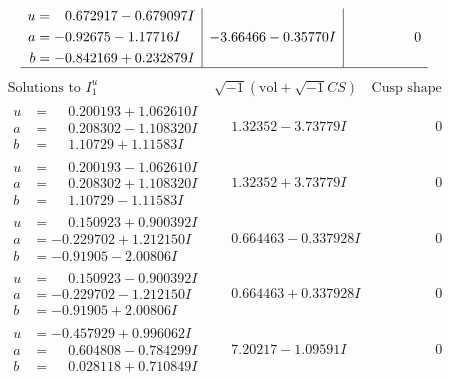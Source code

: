 \documentclass[1p]{elsarticle_modified}
\theoremstyle{definition}
\newcommand{\I}{\sqrt{-1}}
\begin{document}
$$\begin{array}{c|c|c}
\begin{aligned}
u &= \phantom{-}0.672917 - 0.679097 I \\
a &= -0.92675 - 1.17716 I \\
b &= -0.842169 + 0.232879 I\end{aligned}
 & -3.66466 - 0.35770 I & \phantom{-0.000000 } 0\\
 \hline 
 \end{array}$$\newpage$$\begin{array}{c|c|c}  
\text{Solutions to }I^u_{1}& \I (\text{vol} + \sqrt{-1}CS) & \text{Cusp shape}\\
 \hline 
\begin{aligned}
u &= \phantom{-}0.200193 + 1.062610 I \\
a &= \phantom{-}0.208302 - 1.108320 I \\
b &= \phantom{-}1.10729 + 1.11583 I\end{aligned}
 & \phantom{-}1.32352 - 3.73779 I & \phantom{-0.000000 } 0 \\ \hline\begin{aligned}
u &= \phantom{-}0.200193 - 1.062610 I \\
a &= \phantom{-}0.208302 + 1.108320 I \\
b &= \phantom{-}1.10729 - 1.11583 I\end{aligned}
 & \phantom{-}1.32352 + 3.73779 I & \phantom{-0.000000 } 0 \\ \hline\begin{aligned}
u &= \phantom{-}0.150923 + 0.900392 I \\
a &= -0.229702 + 1.212150 I \\
b &= -0.91905 - 2.00806 I\end{aligned}
 & \phantom{-}0.664463 - 0.337928 I & \phantom{-0.000000 } 0 \\ \hline\begin{aligned}
u &= \phantom{-}0.150923 - 0.900392 I \\
a &= -0.229702 - 1.212150 I \\
b &= -0.91905 + 2.00806 I\end{aligned}
 & \phantom{-}0.664463 + 0.337928 I & \phantom{-0.000000 } 0 \\ \hline\begin{aligned}
u &= -0.457929 + 0.996062 I \\
a &= \phantom{-}0.604808 - 0.784299 I \\
b &= \phantom{-}0.028118 + 0.710849 I\end{aligned}
 & \phantom{-}7.20217 - 1.09591 I & \phantom{-0.000000 } 0 \\ \hline\begin{aligned}

\end{aligned}
\end{array}$$
\end{document}
